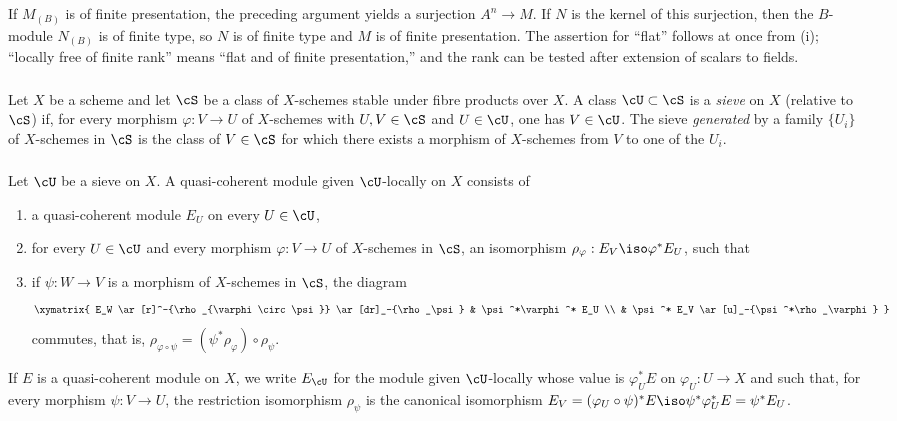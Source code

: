 If $M_{(B)}$ is of finite presentation, the preceding argument yields a
surjection $A^n\to M$. If $N$ is the kernel of this surjection, then the
$B$-module $N_{(B)}$ is of finite type, so $N$ is of finite type and
$M$ is of finite presentation. The assertion for “flat” follows at once
from (i); “locally free of finite rank” means “flat and of finite
presentation,” and the rank can be tested after extension of scalars to
fields.

\subsubsection{}\label{I:1-4-3}

Let $X$ be a scheme and let $\cS$ be a class of $X$-schemes stable under
fibre products over $X$. A class $\cU\subset\cS$ is a \emph{sieve} on
$X$ (relative to $\cS$) if, for every morphism $\varphi:V\to U$ of
$X$-schemes with $U,V\in\cS$ and $U\in\cU$, one has $V\in\cU$.
The sieve \emph{generated} by a family $\{U_i\}$ of $X$-schemes in
$\cS$ is the class of $V\in\cS$ for which there exists a morphism of
$X$-schemes from $V$ to one of the $U_i$.

\subsubsection{}\label{I:1-4-4}

Let $\cU$ be a sieve on $X$. A quasi-coherent module given
$\cU$-locally on $X$ consists of
\begin{enumerate}[\indent a)]
  \item a quasi-coherent module $E_U$ on every $U\in\cU$,
  \item for every $U\in\cU$ and every morphism $\varphi:V\to U$ of
    $X$-schemes in $\cS$, an isomorphism
    $\rho_\varphi:E_V\iso\varphi^*E_U$, such that
  \item if $\psi:W\to V$ is a morphism of $X$-schemes in $\cS$, the
    diagram
    \[\xymatrix{
      E_W \ar[r]^-{\rho_{\varphi\circ\psi}} \ar[dr]_-{\rho_\psi}
        & \psi^*\varphi^* E_U \\
      & \psi^* E_V \ar[u]_-{\psi^*\rho_\varphi}
    }\]
    commutes, that is,
    $\rho_{\varphi\circ\psi}=(\psi^*\rho_\varphi)\circ\rho_\psi$.
\end{enumerate}

If $E$ is a quasi-coherent module on $X$, we write $E_\cU$ for the
module given $\cU$-locally whose value is $\varphi_U^*E$ on $\varphi_U:U\to X$ and such that, for every morphism $\psi:V\to U$, the
restriction isomorphism $\rho_\psi$ is the canonical isomorphism
$E_V=(\varphi_U\circ\psi)^*E\iso\psi^*\varphi_U^*E=\psi^*E_U$.

